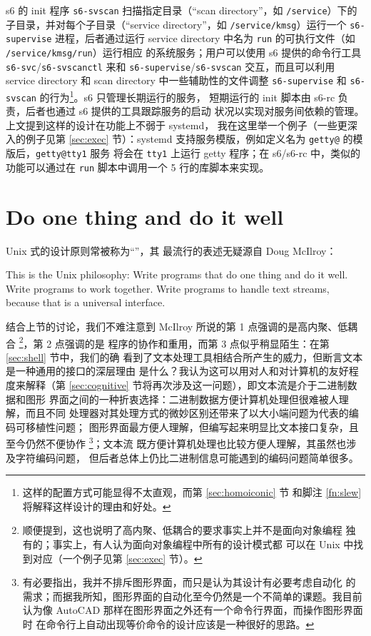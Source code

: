 s6 的 init 程序 \verb|s6-svscan| 扫描指定目录（“scan directory”，如
\verb|/service|）下的子目录，并对每个子目录（“service directory”，如
\verb|/service/kmsg|）运行一个 \verb|s6-supervise| 进程，后者通过运行 service
directory 中名为 \verb|run| 的可执行文件（如 \verb|/service/kmsg/run|）运行相应
的系统服务；用户可以使用 s6 提供的命令行工具 \verb|s6-svc|/\verb|s6-svscanctl|
来和 \verb|s6-supervise|/\verb|s6-svscan| 交互，而且可以利用 service directory
和 scan directory 中一些辅助性的文件调整 \verb|s6-supervise| 和 \verb|s6-svscan|
的行为\footnote{这样的配置方式可能显得不太直观，而第 \ref{sec:homoiconic} 节
和脚注 \ref{fn:slew} 将解释这样设计的理由和好处。}。s6 只管理长期运行的服务，
短期运行的 init 脚本由 s6-rc 负责，后者也通过 s6 提供的工具跟踪服务的启动
状况以实现对服务间依赖的管理。上文提到这样的设计在功能上不弱于 systemd，
我在这里举一个例子（一些更深入的例子见第 \ref{sec:exec} 节）：systemd
支持服务模版，例如定义名为 \verb|getty@| 的模版后，\verb|getty@tty1| 服务
将会在 \verb|tty1| 上运行 getty 程序；在 s6/s6-rc 中，类似的功能可以通过在
\verb|run| 脚本中调用一个 5 行的库脚本来实现。

\section{Do one thing and do it well}\label{sec:mcilroy}

Unix 式的设计原则常被称为“”，其
最流行的表述无疑源自 Doug McIlroy：
\begin{quoting}
	This is the Unix philosophy:  Write programs that do one thing and
	do it well.  Write programs to work together.  Write programs to
	handle text streams, because that is a universal interface.
\end{quoting}

结合上节的讨论，我们不难注意到 McIlroy 所说的第 1 点强调的是高内聚、低耦合%
\footnote{顺便提到，这也说明了高内聚、低耦合的要求事实上并不是面向对象编程
独有的；事实上，有人认为面向对象编程中所有的设计模式都
可以在 Unix 中找到对应（一个例子见第 \ref{sec:exec} 节）。}，第 2 点强调的是
程序的协作和重用，而第 3 点似乎稍显陌生：在第 \ref{sec:shell} 节中，我们的确
看到了文本处理工具相结合所产生的威力，但断言文本是一种通用的接口的深层理由
是什么？我认为这可以用对人和对计算机的友好程度来解释（第
\ref{sec:cognitive} 节将再次涉及这一问题），即文本流是介于二进制数据和图形
界面之间的一种折衷选择：二进制数据方便计算机处理但很难被人理解，而且不同
处理器对其处理方式的微妙区别还带来了以大小端问题为代表的编码可移植性问题；
图形界面最方便人理解，但编写起来明显比文本接口复杂，且至今仍然不便协作%
\footnote{有必要指出，我并不排斥图形界面，而只是认为其设计有必要考虑自动化
的需求；而据我所知，图形界面的自动化至今仍然是一个不简单的课题。我目前
认为像 AutoCAD 那样在图形界面之外还有一个命令行界面，而操作图形界面时
在命令行上自动出现等价命令的设计应该是一种很好的思路。}；文本流
既方便计算机处理也比较方便人理解，其虽然也涉及字符编码问题，
但后者总体上仍比二进制信息可能遇到的编码问题简单很多。

